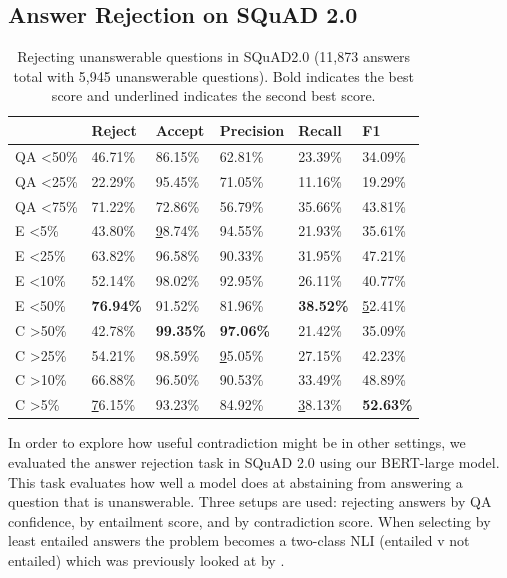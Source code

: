 \documentclass[11pt]{article}
\begin{document}
\subsection{Answer Rejection on SQuAD 2.0}
\begin{table}[t!]
\centering
\begin{tabular}{llllll}
\hline
 & Reject & Accept & Precision & Recall & F1 \\ \hline
QA \textless 50\% & 46.71\% & 86.15\% & 62.81\% & 23.39\% & 34.09\% \\
QA \textless 25\% & 22.29\% & 95.45\% & 71.05\% & 11.16\% & 19.29\% \\
QA  \textless 75\% & 71.22\% & 72.86\% & 56.79\% & 35.66\% & 43.81\% \\
E \textless 5\% & 43.80\% & {\ul 98.74\%} & 94.55\% & 21.93\% & 35.61\% \\
E \textless 25\% & 63.82\% & 96.58\% & 90.33\% & 31.95\% & 47.21\% \\
E \textless 10\% & 52.14\% & 98.02\% & 92.95\% & 26.11\% & 40.77\% \\
E \textless  50\% & \textbf{76.94\%} & 91.52\% & 81.96\% & \textbf{38.52\%} & {\ul 52.41\%} \\
C \textgreater 50\% & 42.78\% & \textbf{99.35\%} & \textbf{97.06\%} & 21.42\% & 35.09\% \\
C \textgreater 25\% & 54.21\% & 98.59\% & {\ul 95.05\%} & 27.15\% & 42.23\% \\
C \textgreater 10\% & 66.88\% & 96.50\% & 90.53\% & 33.49\% & 48.89\% \\
C \textgreater  5\% & {\ul 76.15\%} & 93.23\% & 84.92\% & {\ul 38.13\%} & \textbf{52.63\%} \\ \hline
\end{tabular}
\caption{Rejecting unanswerable questions in SQuAD2.0 (11,873 answers total with 5,945 unanswerable questions). Bold indicates the best score and underlined indicates the second best score.}
\label{tab:rejecting}
\end{table}
In order to explore how useful contradiction might be in other settings, we evaluated the answer rejection task in SQuAD 2.0 \citep{rajpurkar_know_2018} using our BERT-large model. This task evaluates how well a model does at abstaining from answering a question that is unanswerable. Three setups are used: rejecting answers by QA confidence, by entailment score, and by contradiction score. When selecting by least entailed answers the problem becomes a two-class NLI (entailed v not entailed) which was previously looked at by \citet{chen_can_2021}.
\end{document}
